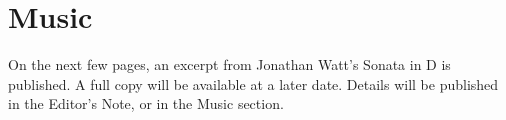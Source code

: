 \documentclass[11pt,a4paper]{report}
\begin{document}
	\chapter{Music}
	
	
		
		On the next few pages, an excerpt from Jonathan Watt's Sonata in D is published. A full copy will be available at a later date. Details will be published in the Editor's Note, or in the Music section.
		
		
	
	
	
	
	
\end{document}

